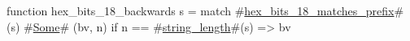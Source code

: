 function hex_bits_18_backwards s =
  match #\hyperref[sailRISCVzhexzybitszy18zymatcheszyprefix]{hex\_bits\_18\_matches\_prefix}#(s) {
      #\hyperref[sailRISCVzSome]{Some}# (bv, n) if n == #\hyperref[sailRISCVzstringzylength]{string\_length}#(s) => bv
  }
